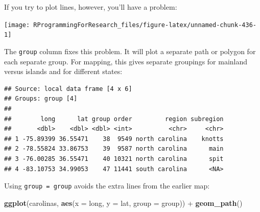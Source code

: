 \documentclass[]{book}
\makeatletter
\newenvironment{Shaded}{\begin{snugshade}}{\end{snugshade}}
\newcommand{\KeywordTok}[1]{\textcolor[rgb]{0.13,0.29,0.53}{\textbf{{#1}}}}
\newcommand{\DataTypeTok}[1]{\textcolor[rgb]{0.13,0.29,0.53}{{#1}}}
\newcommand{\DecValTok}[1]{\textcolor[rgb]{0.00,0.00,0.81}{{#1}}}
\newcommand{\StringTok}[1]{\textcolor[rgb]{0.31,0.60,0.02}{{#1}}}
\newcommand{\NormalTok}[1]{{#1}}
\newenvironment{kframe}{%
\medskip{}
\setlength{\fboxsep}{.8em}
 \def\at@end@of@kframe{}%
 \ifinner\ifhmode%
  \def\at@end@of@kframe{\end{minipage}}%
  \begin{minipage}{\columnwidth}%
 \fi\fi%
 \def\FrameCommand##1{\hskip\@totalleftmargin \hskip-\fboxsep
 \colorbox{shadecolor}{##1}\hskip-\fboxsep
     \hskip-\linewidth \hskip-\@totalleftmargin \hskip\columnwidth}%
 \MakeFramed {\advance\hsize-\width
   \@totalleftmargin\z@ \linewidth\hsize
   \@setminipage}}%
 {\par\unskip\endMakeFramed%
 \at@end@of@kframe}
\renewenvironment{Shaded}{\begin{kframe}}{\end{kframe}}
\makeatother
\begin{document}
If you try to plot lines, however, you'll have a problem:

\begin{Shaded}
\end{Shaded}

\begin{center}\texttt{[image: RProgrammingForResearch\_files/figure-latex/unnamed-chunk-436-1]} \end{center}

The \texttt{group} column fixes this problem. It will plot a separate
path or polygon for each separate group. For mapping, this gives
separate groupings for mainland versus islands and for different states:

\begin{Shaded}
\end{Shaded}

\begin{verbatim}
## Source: local data frame [4 x 6]
## Groups: group [4]
## 
##        long      lat group order         region subregion
##       <dbl>    <dbl> <dbl> <int>          <chr>     <chr>
## 1 -75.89399 36.55471    38  9549 north carolina    knotts
## 2 -78.55824 33.86753    39  9587 north carolina      main
## 3 -76.00285 36.55471    40 10321 north carolina      spit
## 4 -83.10753 34.99053    47 11441 south carolina      <NA>
\end{verbatim}

Using \texttt{group\ =\ group} avoids the extra lines from the earlier
map:

\begin{Shaded}
\begin{Highlighting}[]
\KeywordTok{ggplot}\NormalTok{(carolinas, }\KeywordTok{aes}\NormalTok{(}\DataTypeTok{x =} \NormalTok{long, }\DataTypeTok{y =} \NormalTok{lat,}
                      \DataTypeTok{group =} \NormalTok{group)) +}\StringTok{ }
\StringTok{  }\KeywordTok{geom_path}\NormalTok{()}
\end{Highlighting}
\end{Shaded}
\end{document}

